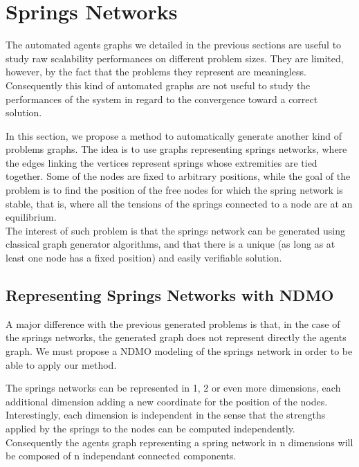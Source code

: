 \section{Springs Networks}

The automated agents graphs we detailed in the previous sections are useful to study raw scalability performances on different problem sizes. They are limited, however, by the fact that the problems they represent are meaningless. Consequently this kind of automated graphs are not useful to study the performances of the system in regard to the convergence toward a correct solution.

In this section, we propose a method to automatically generate another kind of problems graphs. The idea is to use graphs representing springs networks, where the edges linking the vertices represent springs whose extremities are tied together. Some of the nodes are fixed to arbitrary positions, while the goal of the problem is to find the position of the free nodes for which the spring network is stable, that is, where all the tensions of the springs connected to a node are at an equilibrium.\\
The interest of such problem is that the springs network can be generated using classical graph generator algorithms, and that there is a unique (as long as at least one node has a fixed position) and easily verifiable solution.

\subsection{Representing Springs Networks with NDMO}

A major difference with the previous generated problems is that, in the case of the springs networks, the generated graph does not represent directly the agents graph. We must propose a NDMO modeling of the springs network in order to be able to apply our method.

The springs networks can be represented in 1, 2 or even more dimensions, each additional dimension adding a new coordinate for the position of the nodes. Interestingly, each dimension is independent in the sense that the strengths applied by the springs to the nodes can be computed independently. Consequently the agents graph representing a spring network in n dimensions will be composed of n independant connected components.

